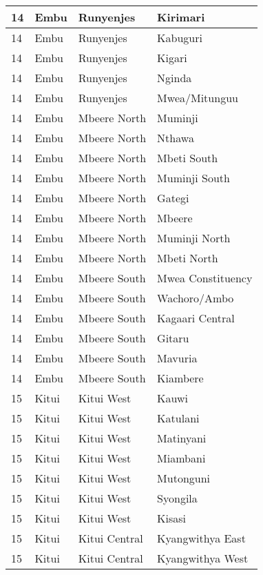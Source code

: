 \begin{table}[!ht]
\begin{tabular}{|l|l|l|l|}
        14 & Embu & Runyenjes & Kirimari \\ \hline
        14 & Embu & Runyenjes & Kabuguri \\ \hline
        14 & Embu & Runyenjes & Kigari \\ \hline
        14 & Embu & Runyenjes & Nginda \\ \hline
        14 & Embu & Runyenjes & Mwea/Mitunguu \\ \hline
        14 & Embu & Mbeere North & Muminji \\ \hline
        14 & Embu & Mbeere North & Nthawa \\ \hline
        14 & Embu & Mbeere North & Mbeti South \\ \hline
        14 & Embu & Mbeere North & Muminji South \\ \hline
        14 & Embu & Mbeere North & Gategi \\ \hline
        14 & Embu & Mbeere North & Mbeere \\ \hline
        14 & Embu & Mbeere North & Muminji North \\ \hline
        14 & Embu & Mbeere North & Mbeti North \\ \hline
        14 & Embu & Mbeere South & Mwea Constituency \\ \hline
        14 & Embu & Mbeere South & Wachoro/Ambo \\ \hline
        14 & Embu & Mbeere South & Kagaari Central \\ \hline
        14 & Embu & Mbeere South & Gitaru \\ \hline
        14 & Embu & Mbeere South & Mavuria \\ \hline
        14 & Embu & Mbeere South & Kiambere \\ \hline
        15 & Kitui & Kitui West & Kauwi \\ \hline
        15 & Kitui & Kitui West & Katulani \\ \hline
        15 & Kitui & Kitui West & Matinyani \\ \hline
        15 & Kitui & Kitui West & Miambani \\ \hline
        15 & Kitui & Kitui West & Mutonguni \\ \hline
        15 & Kitui & Kitui West & Syongila \\ \hline
        15 & Kitui & Kitui West & Kisasi \\ \hline
        15 & Kitui & Kitui Central & Kyangwithya East \\ \hline
        15 & Kitui & Kitui Central & Kyangwithya West \\ \hline

\end{tabular}
\end{table}
